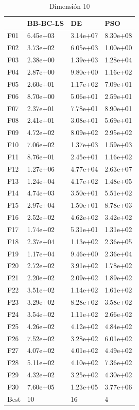 \begin{table}[H]
    \begin{minipage}{.5\linewidth}
      \caption{Dimensión 10}
      \centering
      \begin{tabular}{llll}
        \toprule
        {} &  BB-BC-LS &        DE &       PSO \\
        \midrule
        F01  &  6.45e+03 &  3.14e+07 &  8.30e+08 \\
        F02  &  3.73e+02 &  6.05e+03 &  1.00e+00 \\
        F03  &  2.38e+00 &  1.39e+03 &  1.28e+04 \\
        F04  &  2.87e+00 &  9.80e+00 &  1.16e+02 \\
        F05  &  2.60e+01 &  1.17e+02 &  7.09e+01 \\
        F06  &  8.70e+00 &  5.06e+01 &  2.59e+01 \\
        F07  &  2.37e+01 &  7.78e+01 &  8.90e+01 \\
        F08  &  2.41e+01 &  3.08e+01 &  5.69e+01 \\
        F09  &  4.72e+02 &  8.09e+02 &  2.95e+02 \\
        F10  &  7.06e+02 &  1.37e+03 &  1.59e+03 \\
        F11  &  8.76e+01 &  2.45e+01 &  1.16e+02 \\
        F12  &  1.27e+06 &  4.77e+04 &  2.63e+07 \\
        F13  &  1.24e+04 &  4.17e+02 &  1.48e+05 \\
        F14  &  4.74e+03 &  3.50e+01 &  5.51e+02 \\
        F15  &  2.97e+04 &  1.50e+01 &  8.78e+03 \\
        F16  &  2.52e+02 &  4.62e+02 &  3.42e+02 \\
        F17  &  1.74e+02 &  5.31e+01 &  1.31e+02 \\
        F18  &  2.37e+04 &  1.13e+02 &  2.36e+05 \\
        F19  &  1.17e+04 &  9.46e+00 &  2.36e+04 \\
        F20  &  2.72e+02 &  3.91e+02 &  1.78e+02 \\
        F21  &  2.20e+02 &  2.09e+02 &  1.89e+02 \\
        F22  &  3.51e+02 &  1.14e+02 &  1.61e+02 \\
        F23  &  3.29e+02 &  8.28e+02 &  3.58e+02 \\
        F24  &  3.54e+02 &  1.11e+02 &  2.66e+02 \\
        F25  &  4.26e+02 &  4.12e+02 &  4.84e+02 \\
        F26  &  7.52e+02 &  3.28e+02 &  6.01e+02 \\
        F27  &  4.07e+02 &  4.01e+02 &  4.49e+02 \\
        F28  &  5.11e+02 &  4.10e+02 &  7.36e+02 \\
        F29  &  4.32e+02 &  3.25e+02 &  4.30e+02 \\
        F30  &  7.60e+05 &  1.23e+05 &  3.77e+06 \\
        Best &        10 &        16 &         4 \\
        \bottomrule
        \end{tabular}
        

\end{minipage}
\end{table}
